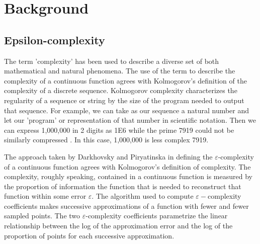 

\chapter{Background}
  


  
\section{Epsilon-complexity} 
  

  The term 'complexity' has been used to describe a diverse set of both mathematical and natural phenomena. The use of the term to describe the complexity of a continuous function agrees with Kolmogorov's definition of the complexity of a discrete sequence. Kolmogorov complexity characterizes the regularity of a
   sequence or string by the size of the program needed to output that sequence. For example, we can take as our sequence a natural number and let our 'program' or representation of that number in scientific notation.
    Then we can express 1,000,000 in 2 digits as 1E6 while the prime 7919 could not be similarly compressed \cite{vitanyi1993}. In this case, 1,000,000 is less complex 7919. 

  The approach taken by Darkhovsky and Piryatinska in defining the $\varepsilon$-complexity of a continuous function agrees with Kolmogorov's definition of complexity\cite{darkhovsky2013}. 
   The complexity, roughly speaking, contained in a continuous 
   function is measured by the proportion of information the function that is needed to reconstruct that function within some error $\varepsilon$. 
   The algorithm used to compute $\varepsilon-$complexity coefficients makes successive approximations of
   a function with fewer and fewer sampled points. The two $\varepsilon$-complexity coefficients parametrize the linear 
   relationship between 
   the log of the approximation error and the log of the proportion 
   of points for each successive approximation.

